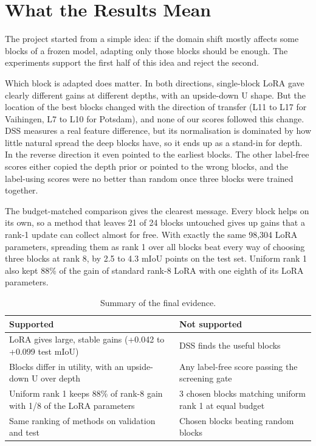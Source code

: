 \documentclass[11pt,a4paper]{report}
\begin{document}
\section{What the Results Mean}

The project started from a simple idea: if the domain shift mostly affects some blocks of a frozen model, adapting only those blocks should be enough. The experiments support the first half of this idea and reject the second.

Which block is adapted does matter. In both directions, single-block LoRA gave clearly different gains at different depths, with an upside-down U shape. But the location of the best blocks changed with the direction of transfer (L11 to L17 for Vaihingen, L7 to L10 for Potsdam), and none of our scores followed this change. DSS measures a real feature difference, but its normalisation is dominated by how little natural spread the deep blocks have, so it ends up as a stand-in for depth. In the reverse direction it even pointed to the earliest blocks. The other label-free scores either copied the depth prior or pointed to the wrong blocks, and the label-using scores were no better than random once three blocks were trained together.

The budget-matched comparison gives the clearest message. Every block helps on its own, so a method that leaves 21 of 24 blocks untouched gives up gains that a rank-1 update can collect almost for free. With exactly the same 98,304 LoRA parameters, spreading them as rank 1 over all blocks beat every way of choosing three blocks at rank 8, by 2.5 to 4.3 mIoU points on the test set. Uniform rank 1 also kept 88\% of the gain of standard rank-8 LoRA with one eighth of its LoRA parameters.

\begin{table}[t]
\centering
\caption{Summary of the final evidence.}
\label{tab:summary}
\small
\begin{tabular}{@{}p{3.6cm}p{3.6cm}@{}}
\toprule
\textbf{Supported} & \textbf{Not supported} \\
\midrule
LoRA gives large, stable gains (+0.042 to +0.099 test mIoU) & DSS finds the useful blocks \\
Blocks differ in utility, with an upside-down U over depth & Any label-free score passing the screening gate \\
Uniform rank 1 keeps 88\% of rank-8 gain with 1/8 of the LoRA parameters & 3 chosen blocks matching uniform rank 1 at equal budget \\
Same ranking of methods on validation and test & Chosen blocks beating random blocks \\
\bottomrule
\end{tabular}
\end{table}
\end{document}

